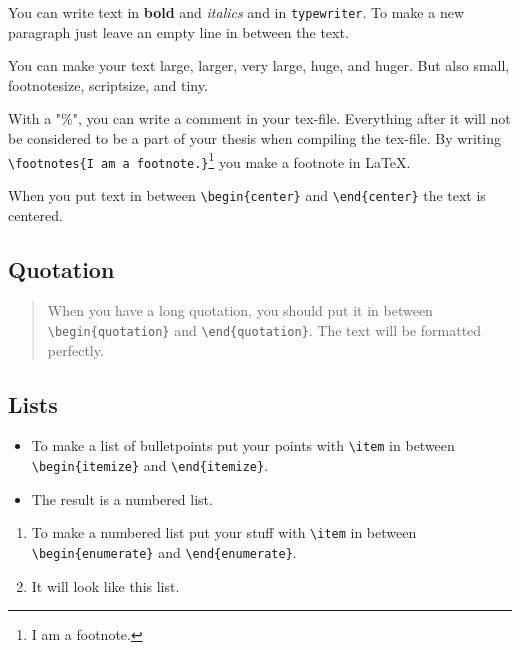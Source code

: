 \documentclass[12pt,final,a4paper,oneside]{book}
\begin{document}
You can write text in \textbf{bold} and \textit{italics} and in \texttt{typewriter}. To make a new paragraph just leave an empty line in between the text.
	
You can make your text {\large large}, {\Large larger}, {\LARGE very large}, {\huge huge}, and {\Huge huger}. But also {\small small}, {\footnotesize footnotesize}, {\scriptsize scriptsize}, and {\tiny tiny}. 

With a "\%", you can write a comment in your tex-file. Everything after it will not be considered to be a part of your thesis when compiling the tex-file. %
By writing \verb|\footnotes{I am a footnote.}|\footnote{I am a footnote.} you make a footnote in \LaTeX.

\begin{center}
	When you put text in between \verb*|\begin{center}| and \verb*|\end{center}| the text is centered.
\end{center}

\subsection{Quotation}
	
\begin{quotation}
	When you have a long quotation, you should put it in between \verb*|\begin{quotation}| and \verb*|\end{quotation}|. The text will be formatted perfectly.	
\end{quotation}
	
\subsection{Lists}
	
\begin{itemize}
	\item To make a list of bulletpoints put your points with \verb*|\item| in between \verb*|\begin{itemize}| and \verb*|\end{itemize}|. 
	\item The result is a numbered list.	
\end{itemize}
	
\begin{enumerate}
	\item To make a numbered list put your stuff with \verb*|\item| in between \verb*|\begin{enumerate}| and \verb*|\end{enumerate}|. 
	\item It will look like this list.	
\end{enumerate}
	
\end{document}
